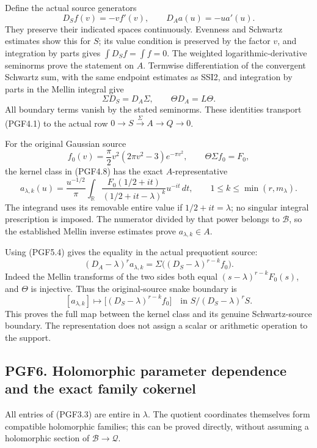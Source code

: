 Define the actual source generators \[
D_Sf(v)=-v f'(v),\qquad D_Aa(u)=-u a'(u).
\tag{PGF5.3}
\] They preserve their indicated spaces continuously. Evenness and
Schwartz estimates show this for \(S\); its value condition is preserved
by the factor \(v\), and integration by parts gives
\(\int D_Sf=\int f=0\). The weighted logarithmic-derivative seminorms
prove the statement on \(A\). Termwise differentiation of the convergent
Schwartz sum, with the same endpoint estimates as SSI2, and integration
by parts in the Mellin integral give \[
\Sigma D_S=D_A\Sigma,
\qquad \Theta D_A=L\Theta.
\tag{PGF5.4}
\] All boundary terms vanish by the stated seminorms. These identities
transport (PGF4.1) to the actual row
\(0\to S\xrightarrow\Sigma A\to Q\to0\).

For the original Gaussian source \[
f_0(v)=\frac\pi2v^2(2\pi v^2-3)e^{-\pi v^2},
\qquad \Theta\Sigma f_0=F_0,
\tag{PGF5.5}
\] the kernel class in (PGF4.8) has the exact \(A\)-representative \[
a_{\lambda,k}(u)=\frac{u^{-1/2}}\pi
\int_{\mathbb R}
\frac{F_0(1/2+it)}{(1/2+it-\lambda)^k}u^{-it}\,dt,
\qquad 1\le k\le\min(r,m_\lambda).
\tag{PGF5.6}
\] The integrand uses its removable entire value if \(1/2+it=\lambda\);
no singular integral prescription is imposed. The numerator divided by
that power belongs to \(\mathcal B\), so the established Mellin inverse
estimates prove \(a_{\lambda,k}\in A\).

Using (PGF5.4) gives the equality in the actual prequotient source: \[
(D_A-\lambda)^r a_{\lambda,k}
=\Sigma\bigl((D_S-\lambda)^{r-k}f_0\bigr).
\tag{PGF5.7}
\] Indeed the Mellin transforms of the two sides both equal
\((s-\lambda)^{r-k}F_0(s)\), and \(\Theta\) is injective. Thus the
original-source snake boundary is \[
[a_{\lambda,k}]
\longmapsto
\bigl[(D_S-\lambda)^{r-k}f_0\bigr]
\quad\text{in }S/(D_S-\lambda)^rS.
\tag{PGF5.8}
\] This proves the full map between the kernel class and its genuine
Schwartz-source boundary. The representation does not assign a scalar or
arithmetic operation to the support.

\subsection{PGF6. Holomorphic parameter dependence and the exact family
cokernel}\label{pgf6.-holomorphic-parameter-dependence-and-the-exact-family-cokernel}

All entries of (PGF3.3) are entire in \(\lambda\). The quotient
coordinates themselves form compatible holomorphic families; this can be
proved directly, without assuming a holomorphic section of
\(\mathcal B\to\mathcal Q\).

